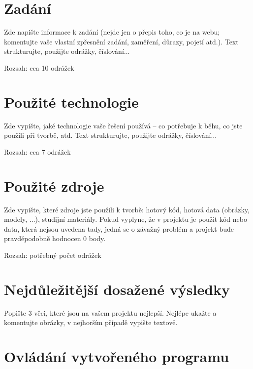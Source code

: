 \documentclass[11pt,a4paper]{article}
\begin{document}
\titlepageandcontents

\section{Zadání}

Zde napište informace k zadání (nejde jen o přepis toho, co je na webu;
komentujte vaše vlastní zpřesnění zadání, zaměření, důrazy, pojetí atd.). Text
strukturujte, použijte odrážky, číslování$\ldots$

Rozsah: cca 10 odrážek

\section{Použité technologie}

Zde vypište, jaké technologie vaše řešení používá – co potřebuje k běhu, co
jste použili při tvorbě, atd. Text strukturujte, použijte odrážky,
číslování$\ldots$

Rozsah: cca 7 odrážek

\section{Použité zdroje}

Zde vypište, které zdroje jste použili k tvorbě: hotový kód, hotová data
(obrázky, modely, $\ldots$), studijní materiály. Pokud vyplyne, že v projektu
je použit kód nebo data, která nejsou uvedena tady, jedná se o závažný problém
a projekt bude pravděpodobně hodnocen 0 body.

Rozsah: potřebný počet odrážek

\section{Nejdůležitější dosažené výsledky}

Popište 3 věci, které jsou na vašem projektu nejlepší. Nejlépe ukažte a
komentujte obrázky, v nejhorším případě vypište textově.

\section{Ovládání vytvořeného programu}
\end{document}
